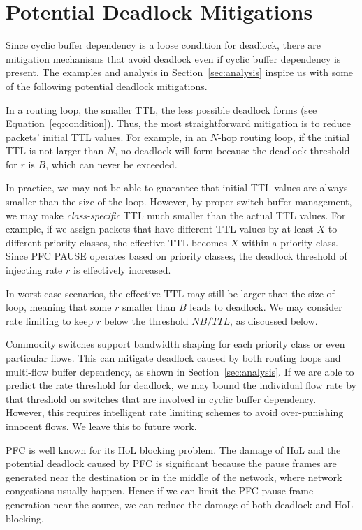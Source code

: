 \secspacelarge
\section{Potential Deadlock Mitigations}
\label{sec:mitigation}
\secspace

Since cyclic buffer dependency is a loose condition for deadlock, there are
mitigation mechanisms that avoid deadlock even if cyclic buffer dependency is present.
The examples and analysis in Section~\ref{sec:analysis}
inspire us with some of the following potential deadlock mitigations.


 In a routing loop, 
the smaller TTL, the less possible deadlock forms (see Equation~\ref{eq:condition}).
Thus, the most straightforward mitigation is to reduce packets' initial TTL values.
For example, in an $N$-hop routing loop, if the initial TTL is not larger than $N$,
no deadlock will form because the deadlock threshold for $r$ is $B$, which can
never be exceeded.

In practice, we may not be able to guarantee that initial TTL values are always smaller than
the size of the loop. However, by proper switch buffer management, we may make {\em class-specific}
TTL much smaller than the actual TTL values. For example, if we assign packets 
that have different TTL values by at least $X$ to different priority classes, the effective TTL becomes $X$
within a priority class. Since PFC PAUSE operates based on priority classes, the deadlock threshold
of injecting rate $r$ is effectively increased.

In worst-case scenarios, the effective TTL may still be larger than the size of loop, meaning
that some $r$ smaller than $B$ leads to deadlock. We may consider rate limiting to keep
$r$ below the threshold $NB/TTL$, as discussed below.

 Commodity switches support bandwidth shaping for each priority class
or even particular flows. This can mitigate deadlock caused by both routing loops and multi-flow
buffer dependency, as shown in Section~\ref{sec:analysis}. If we are able to predict the rate 
threshold for deadlock, we may bound the individual flow rate by that threshold on switches 
that are involved in cyclic buffer dependency. However, this requires intelligent rate
limiting schemes to avoid over-punishing innocent flows. We leave this to future work.


PFC is well known for its HoL blocking problem. The damage of HoL and the potential deadlock caused 
by PFC is significant because the pause frames are generated near the destination or in the middle of 
the network, where network congestions usually happen. Hence if we can limit the PFC pause frame 
generation near the source, we can reduce the damage of both deadlock and HoL blocking. 

